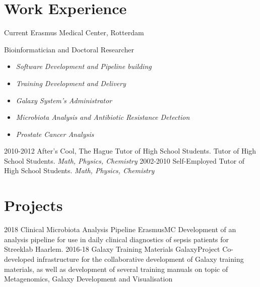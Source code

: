\documentclass[]{shiltemann-cv}
\begin{document}
\section{Work Experience}

\begin{entrylist}
 \entry
    {Current}
    {Erasmus Medical Center, Rotterdam}
    {}
    {Bioinformatician and Doctoral Researcher
     \begin{itemize}
     \item \emph{Software Development and Pipeline building}
     \item \emph{Training Development and Delivery}
     \item \emph{Galaxy System's Administrator}
     \item \emph{Microbiota Analysis and Antibiotic Resistance Detection}
     \item \emph{Prostate Cancer Analysis}
     \end{itemize}}
  \entry
    {2010-2012}
    {After's Cool, The Hague}
    {Tutor of High School Students.}
    {Tutor of High School Students. \emph{Math, Physics, Chemistry}}
  \entry
    {2002-2010}
    {Self-Employed}
    {}
    {Tutor of High School Students. \emph{Math, Physics, Chemistry}}
\end{entrylist}

\section{Projects}

\begin{entrylist}
  \entry
    {2018}
    {Clinical Microbiota Analysis Pipeline}
    {ErasmusMC}
    {Development of an analysis pipeline for use in daily clinical diagnostics of sepsis patients for Streeklab Haarlem.}
  \entry
    {2016-18}
    {Galaxy Training Materials}
    {GalaxyProject}
    {Co-developed infrastructure for the collaborative development of Galaxy training materials, as well as development of several training manuals on topic of Metagenomics, Galaxy Development and Visualisation}
\end{entrylist}

\newpage
{}
\end{document}
